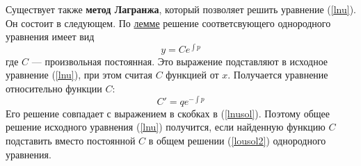 Существует также \textbf{метод Лагранжа}, который позволяет решить уравнение (\ref{lnu}). Он состоит в следующем. По \hyperlink{loulemma}{лемме} решение соответсвующего однородного уравнения имеет вид
\begin{equation}
    y = Ce^{\int p} \label{lousol2}
\end{equation}
где $C$ --- произвольная постоянная. Это выражение подставляют в исходное уравнение (\ref{lnu}), при этом считая $C$ функцией от $x$. Получается уравнение относительно функции $C$:
\begin{equation*}
    C' = qe^{-\int p}
\end{equation*}
Его решение совпадает с выражением в скобках в (\ref{lnusol}). Поэтому общее решение исходного уравнения (\ref{lnu}) получится, если найденную функцию $C$ подставить вместо постоянной $C$ в общем решении (\ref{lousol2}) однородного уравнения.
